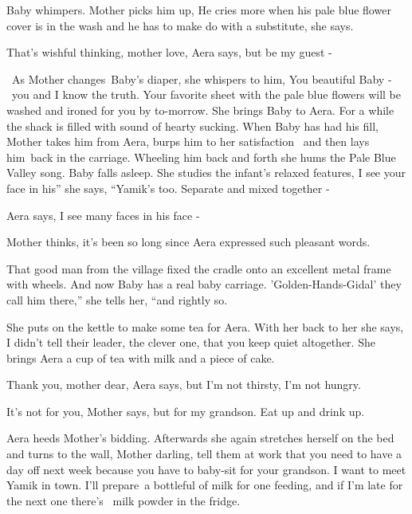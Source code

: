 \documentclass[letterpaper]{article}
\begin{document}
Baby whimpers. Mother picks him up, {\textquotedbl}He cries more when his pale blue flower cover is in the wash and he
has to make do with a substitute,{\textquotedbl} she says. 

{\textquotedbl}That's wishful thinking, mother love,{\textquotedbl} Aera says, {\textquotedbl}but be my guest
-{\textquotedbl}

~As Mother changes~Baby's diaper, she whispers to him, {\textquotedbl}You beautiful Baby - ~you and I know the truth.
Your favorite sheet with the pale blue flowers will be washed and ironed for you by to-morrow.{\textquotedbl} She
brings Baby to Aera. For a while the shack is filled with sound of hearty sucking. When Baby has had his fill, Mother
takes him from Aera, burps him to her satisfaction \ and then lays him~back in the carriage. Wheeling him back and
forth she hums the Pale Blue Valley song. Baby falls asleep. She studies the infant's relaxed features,
{\textquotedbl}I see your face in his'' she says, ``Yamik's too. Separate and mixed together -{\textquotedbl} 

Aera says, {\textquotedbl}I see many faces in his face -{\textquotedbl}~ 

Mother thinks, it's been so long since Aera expressed such{ }pleasant words. 

{\textquotedbl}That good man from the village fixed the cradle onto{ }an excellent metal frame with
wheels. And now Baby has a real baby carriage. 'Golden-Hands-Gidal' they call him there,'' she tells her, ``and rightly
so.{\textquotedbl} 

She puts on the kettle to make some tea for Aera. With her back to her she says, {\textquotedbl}I didn't tell their
leader, the clever one, that you keep quiet altogether.{\textquotedbl} She brings Aera a cup of tea with milk and a
piece of cake. 

{\textquotedbl}Thank you, mother dear,{\textquotedbl} Aera says, {\textquotedbl}but I'm not thirsty, I'm not
hungry.{\textquotedbl} 

{\textquotedbl}It's not for you,{\textquotedbl} Mother says, {\textquotedbl}but for my grandson. Eat up and drink
up.{\textquotedbl} 

Aera heeds Mother's bidding. Afterwards she again stretches herself on the bed and turns to the wall,
{\textquotedbl}Mother darling, tell them at work that you need to have a day off next week because you have to baby-sit
for your grandson. I want to meet Yamik in town. I'll prepare~a bottleful of milk for one feeding, and if I'm late for
the next one there's ~milk powder in the fridge.{\textquotedbl}
\end{document}
